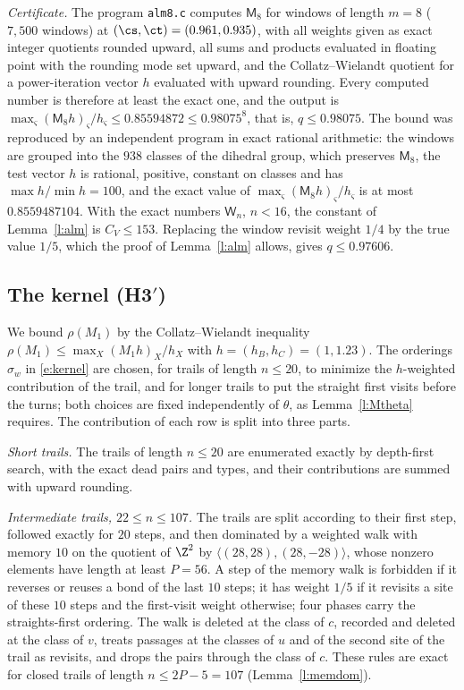 \emph{Certificate.} The program \texttt{alm8.c} computes $\mathsf M_8$ for windows of length $m = 8$ ($7{, }500$ windows) at $(\cs, \ct) = (0.961, 0.935)$, with all weights given as exact integer quotients rounded upward, all sums and products evaluated in floating point with the rounding mode set upward, and the Collatz--Wielandt quotient for a power-iteration vector $h$ evaluated with upward rounding. Every computed number is therefore at least the exact one, and the output is $\max_\varsigma (\mathsf M_8 h)_\varsigma / h_\varsigma \le 0.85594872 \le 0.98075^8$, that is, $q \le 0.98075$. The bound was reproduced by an independent program in exact rational arithmetic: the windows are grouped into the $938$ classes of the dihedral group, which preserves $\mathsf M_8$, the test vector $h$ is rational, positive, constant on classes and has $\max h / \min h = 100$, and the exact value of $\max_\varsigma (\mathsf M_8 h)_\varsigma / h_\varsigma$ is at most $0.8559487104$. With the exact numbers $\mathsf W_n$, $n < 16$, the constant of Lemma~\ref{l:alm} is $C_V \le 153$. Replacing the window revisit weight $1/4$ by the true value $1/5$, which the proof of Lemma~\ref{l:alm} allows, gives $q \le 0.97606$.

\subsection{The kernel (H3$'$)}\label{s:H3}

We bound $\rho(M_1)$ by the Collatz--Wielandt inequality $\rho(M_1) \le \max_X (M_1 h)_X / h_X$ with $h = (h_B, h_C) = (1, 1.23)$. The orderings $\sigma_w$ in \eqref{e:kernel} are chosen, for trails of length $n \le 20$, to minimize the $h$-weighted contribution of the trail, and for longer trails to put the straight first visits before the turns; both choices are fixed independently of $\theta$, as Lemma~\ref{l:Mtheta} requires. The contribution of each row is split into three parts.

\emph{Short trails.} The trails of length $n \le 20$ are enumerated exactly by depth-first search, with the exact dead pairs and types, and their contributions are summed with upward rounding.

\emph{Intermediate trails, $22 \le n \le 107$.} The trails are split according to their first step, followed exactly for $20$ steps, and then dominated by a weighted walk with memory $10$ on the quotient of $\Z^2$ by $\langle (28, 28), (28, -28) \rangle$, whose nonzero elements have length at least $P = 56$. A step of the memory walk is forbidden if it reverses or reuses a bond of the last $10$ steps; it has weight $1/5$ if it revisits a site of these $10$ steps and the first-visit weight otherwise; four phases carry the straights-first ordering. The walk is deleted at the class of $c$, recorded and deleted at the class of $v$, treats passages at the classes of $u$ and of the second site of the trail as revisits, and drops the pairs through the class of $c$. These rules are exact for closed trails of length $n \le 2P - 5 = 107$ (Lemma~\ref{l:memdom}).

